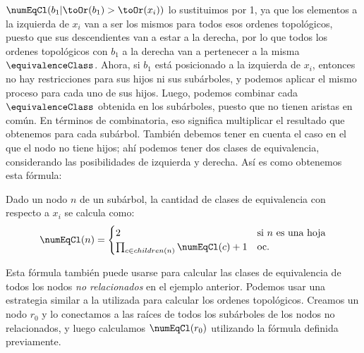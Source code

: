 
$\numEqCl(b_1 | \toOr(b_1) > \toOr(x_i) )$ lo sustituimos por 1, ya que los elementos a la izquierda de $x_i$ van a ser los mismos para todos esos ordenes topológicos, puesto que sus descendientes van a estar a la derecha, por lo que todos los ordenes topológicos con $b_1$ a la derecha van a pertenecer a la misma $\equivalenceClass$.
Ahora, si $b_1$ está posicionado a la izquierda de $x_i$, entonces no hay restricciones para sus hijos ni sus subárboles, y podemos aplicar el mismo proceso para cada uno de sus hijos. Luego, podemos combinar cada $\equivalenceClass$ obtenida en los subárboles, puesto que no tienen aristas en común. En términos de combinatoria, eso significa multiplicar el resultado que obtenemos para cada subárbol. También debemos tener en cuenta el caso en el que el nodo no tiene hijos; ahí podemos tener dos clases de equivalencia, considerando las posibilidades de izquierda y derecha. Así es como obtenemos esta fórmula:

\begin{definition}\label{formula:number_of_equiv_classes}
Dado un nodo $n$ de un subárbol, la cantidad de clases de equivalencia con respecto a $x_i$ se calcula como:
$$    \numEqCl(n) = 
    \begin{cases} 
    2 & \text{si $n$ es una hoja} \\
    \prod_{c \in children(n)} \numEqCl(c) + 1 & \text{oc.}
    \end{cases}
$$
    
\end{definition}


Esta fórmula también puede usarse para calcular las clases de equivalencia de todos los nodos \emph{no relacionados} en el ejemplo anterior. Podemos usar una estrategia similar a la utilizada para calcular los ordenes topológicos. Creamos un nodo $r_0$ y lo conectamos a las raíces de todos los subárboles de los nodos no relacionados, y luego calculamos $\numEqCl(r_0)$ utilizando la fórmula definida previamente. 

